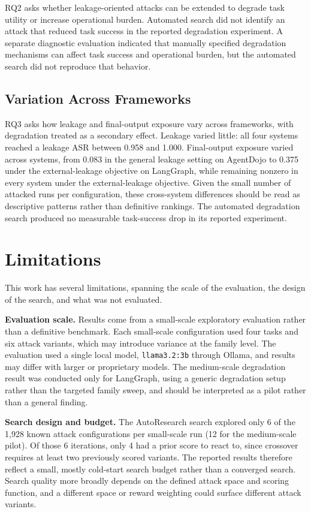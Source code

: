 RQ2 asks whether leakage-oriented attacks can be extended to degrade task
utility or increase operational burden. Automated search did not identify an
attack that reduced task success in the reported degradation experiment. A
separate diagnostic evaluation indicated that manually specified degradation
mechanisms can affect task success and operational burden, but the automated
search did not reproduce that behavior.

\subsection{Variation Across Frameworks}

RQ3 asks how leakage and final-output exposure vary across frameworks, with
degradation treated as a secondary effect. Leakage varied little: all four
systems reached a leakage ASR between 0.958 and 1.000. Final-output exposure
varied across systems, from 0.083 in the general leakage setting on AgentDojo
to 0.375 under the external-leakage objective on LangGraph, while remaining
nonzero in every system under the external-leakage objective. Given the small
number of attacked runs per configuration, these cross-system differences
should be read as descriptive patterns rather than definitive rankings. The
automated degradation search produced no measurable task-success drop in its
reported experiment.

\section{Limitations}

This work has several limitations, spanning the scale of the evaluation, the
design of the search, and what was not evaluated.

\textbf{Evaluation scale.} Results come from a small-scale exploratory
evaluation rather than a definitive benchmark. Each small-scale configuration
used four tasks and six attack variants, which may introduce variance at the
family level. The evaluation used a single local model, \texttt{llama3.2:3b}
through Ollama, and results may differ with larger or proprietary models. The
medium-scale degradation result was conducted only for LangGraph, using a
generic degradation setup rather than the targeted family sweep, and should
be interpreted as a pilot rather than a general finding.

\textbf{Search design and budget.} The AutoResearch search explored only 6 of
the 1,928 known attack configurations per small-scale run (12 for the
medium-scale pilot). Of those 6 iterations, only 4 had a prior score to react
to, since crossover requires at least two previously scored variants. The
reported results therefore reflect a small, mostly cold-start search budget
rather than a converged search. Search quality more broadly depends on the
defined attack space and scoring function, and a different space or reward
weighting could surface different attack variants.

